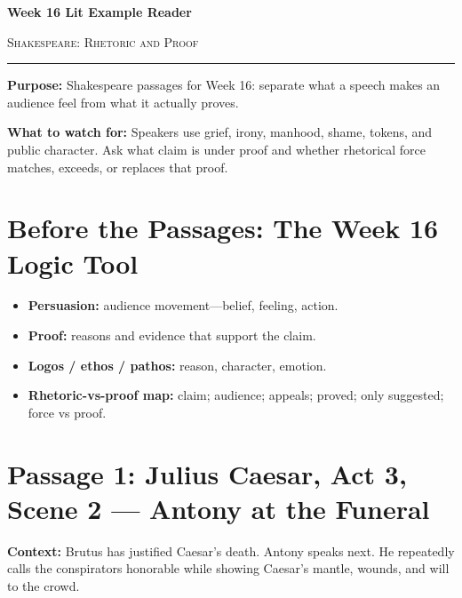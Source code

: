 \documentclass[12pt]{article}
\begin{document}
\begin{center}
{\LARGE\bfseries Week 16 Lit Example Reader}\par\vspace{0.02em}
{\large\scshape Shakespeare: Rhetoric and Proof}\par\vspace{0.06em}
\rule{0.78\textwidth}{0.5pt}
\end{center}

\textbf{Purpose:} Shakespeare passages for Week 16: separate what a speech makes an audience feel from what it actually proves.

\textbf{What to watch for:} Speakers use grief, irony, manhood, shame, tokens, and public character. Ask what claim is under proof and whether rhetorical force matches, exceeds, or replaces that proof.

\section*{Before the Passages: The Week 16 Logic Tool}

\begin{itemize}[leftmargin=1.3em,itemsep=0.05em,topsep=0.08em,parsep=0.03em]
\item \textbf{Persuasion:} audience movement---belief, feeling, action.
\item \textbf{Proof:} reasons and evidence that support the claim.
\item \textbf{Logos / ethos / pathos:} reason, character, emotion.
\item \textbf{Rhetoric-vs-proof map:} claim; audience; appeals; proved; only suggested; force vs proof.
\end{itemize}

\section*{Passage 1: Julius Caesar, Act 3, Scene 2 --- Antony at the Funeral}

\textbf{Context:} Brutus has justified Caesar's death. Antony speaks next. He repeatedly calls the conspirators honorable while showing Caesar's mantle, wounds, and will to the crowd.
\end{document}
